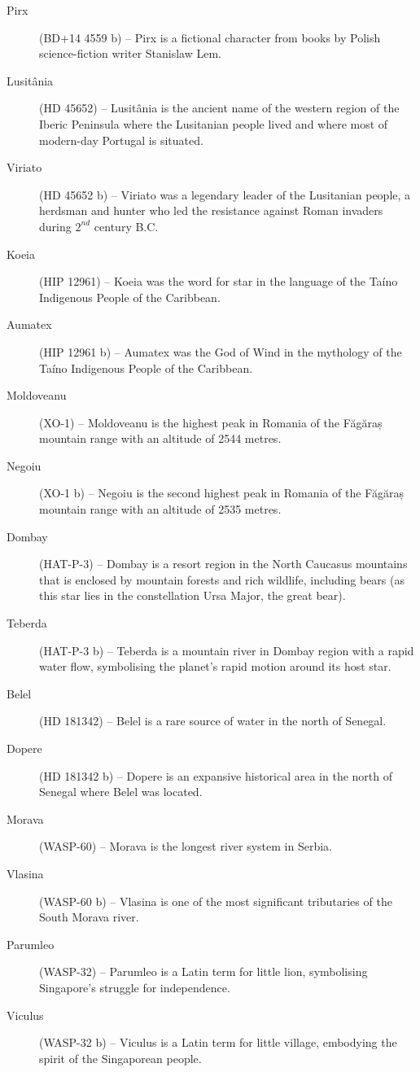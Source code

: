 \begin{description}
\item[Pirx] (BD+14 4559 b) -- Pirx is a fictional character from books by Polish science-fiction writer Stanislaw Lem.
\item[Lusitânia] (HD 45652) -- Lusitânia is the ancient name of the western region of the Iberic Peninsula where the Lusitanian people lived and where most of modern-day Portugal is situated.
\item[Viriato] (HD 45652 b) -- Viriato was a legendary leader of the Lusitanian people, a herdsman and hunter who led the resistance against Roman invaders during $2^{nd}$ century B.C.
\item[Koeia] (HIP 12961) -- Koeia was the word for star in the language of the Taíno Indigenous People of the Caribbean.
\item[Aumatex] (HIP 12961 b) -- Aumatex was the God of Wind in the mythology of the Taíno Indigenous People of the Caribbean.
\item[Moldoveanu] (XO-1) -- Moldoveanu is the highest peak in Romania of the Făgăraș mountain range with an altitude of 2544 metres.
\item[Negoiu] (XO-1 b) -- Negoiu is the second highest peak in Romania of the Făgăraș mountain range with an altitude of 2535 metres.
\item[Dombay] (HAT-P-3) -- Dombay is a resort region in the North Caucasus mountains that is enclosed by mountain forests and rich wildlife, including bears (as this star lies in the constellation Ursa Major, the great bear).
\item[Teberda] (HAT-P-3 b) -- Teberda is a mountain river in Dombay region with a rapid water flow, symbolising the planet's rapid motion around its host star.
\item[Belel] (HD 181342) -- Belel is a rare source of water in the north of Senegal.
\item[Dopere] (HD 181342 b) -- Dopere is an expansive historical area in the north of Senegal where Belel was located.
\item[Morava] (WASP-60) -- Morava is the longest river system in Serbia.
\item[Vlasina] (WASP-60 b) -- Vlasina is one of the most significant tributaries of the South Morava river.
\item[Parumleo] (WASP-32) -- Parumleo is a Latin term for little lion, symbolising Singapore's struggle for independence.
\item[Viculus] (WASP-32 b) -- Viculus is a Latin term for little village, embodying the spirit of the Singaporean people.

\end{description}

